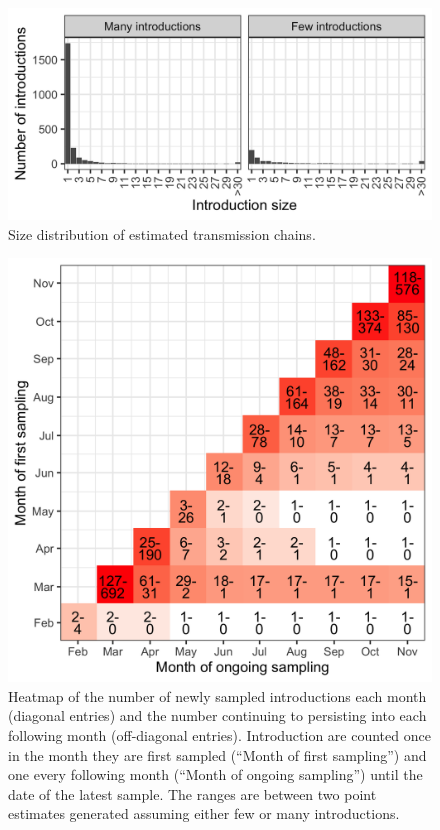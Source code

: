 \documentclass[9pt,twoside,lineno]{pnas-new}
\begin{document}
\begin{figure}
\centering
\includegraphics[width = 11.4cm]{figures/chain_size_dist.png}
\caption{Size distribution of estimated transmission chains.}  
\label{fig:chain_size_dist}
\end{figure}

\begin{figure}
\centering
\includegraphics[width = 11.4cm]{figures/chain_longevity_matrix.png}
\caption{Heatmap of the number of newly sampled introductions each month (diagonal entries) and the number continuing to persisting into each following month (off-diagonal entries). Introduction are counted once in the month they are first sampled (``Month of first sampling'') and one every following month (``Month of ongoing sampling'') until the date of the latest sample. The ranges are between two point estimates generated assuming either few or many introductions.}  
\label{fig:chain-longevity-matrix}
\end{figure}
\end{document}
